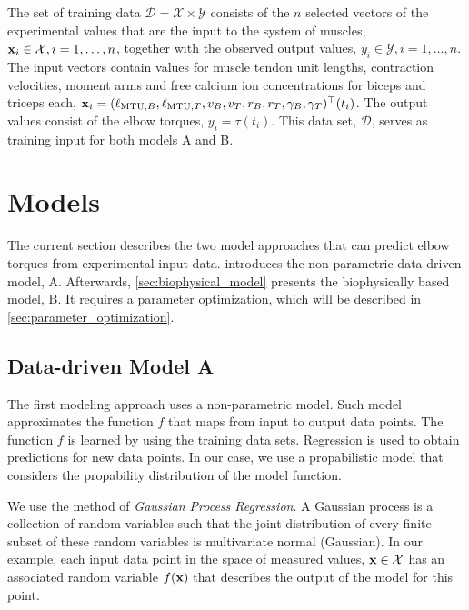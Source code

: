 The set of training data $\mathcal{D} = \mathcal{X} \times \mathcal{Y}$ consists of the $n$ selected vectors of the experimental values that are the input to the system of muscles, $\textbf{x}_i \in \mathcal{X}, i=1,\dots, n$, together with the observed output values, $y_i \in \mathcal{Y}, i=1,\dots,n$.
The input vectors contain values for muscle tendon unit lengths, contraction velocities, moment arms and free calcium ion concentrations for biceps and triceps each, $\textbf{x}_i = (\ell_{\text{MTU},B}, \ell_{\text{MTU},T}, v_B, v_T, r_{B}, r_{T}, \gamma_B, \gamma_T)^\top(t_i)$. The output values consist of the elbow torques, $y_i = \tau(t_i)$. This data set, $\mathcal{D}$, serves as training input for both models A and B.

\section{Models}\label{sec:study_models}

The current section describes the two model approaches that can predict elbow torques from experimental input data.  introduces the non-parametric data driven model, A. Afterwards, \cref{sec:biophysical_model} presents the biophysically based model, B. It requires a parameter optimization, which will be described in \cref{sec:parameter_optimization}.

\subsection{Data-driven Model A}\label{sec:data_driven_model}

The first modeling approach uses a non-parametric model. Such model approximates the function $f$ that maps from input to output data points. The function $f$ is learned by using the training data sets. Regression is used to obtain predictions for new data points. In our case, we use a propabilistic model that considers the propability distribution of the model function.

We use the method of \emph{Gaussian Process Regression}. A Gaussian process is a collection of random variables such that the joint distribution of every finite subset of these random variables is multivariate normal (Gaussian).
In our example, each input data point in the space of measured values, $\textbf{x} \in \mathcal{X}$ has an associated random variable $f(\textbf{x})$ that describes the output of the model for this point.


